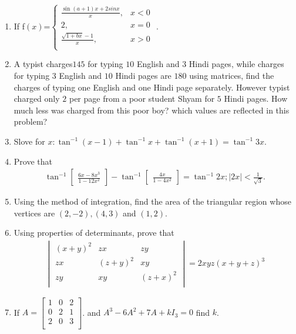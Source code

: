 \documentclass[12pt,-letter paper]{article}
\providecommand{\mydet}[1]{\ensuremath{\begin{vmatrix}#1\end{vmatrix}}}
\providecommand{\myvec}[1]{\ensuremath{\begin{bmatrix}#1\end{bmatrix}}}
\providecommand{\brak}[1]{\ensuremath{\left(#1\right)}}
\begin{document}
\begin{enumerate}
		  \item If f\brak{x}=$\begin{cases}
		  \frac{\sin(a+1)x+2 sinx}{x},&x<0\\   2  ,&x=0\\ \frac{\sqrt{1+bx}-1}{x},&x>0\\ \end{cases}$
   .




 \item A typist charges\rupee$145$ for typing $10$ English and $3$ Hindi pages, while charges for typing $3$ English and $10$ Hindi pages are \rupee$180$ using matrices, find the charges of typing one English and one Hindi page separately. However typist charged only \rupee$2$  per page from a poor student Shyam for $5$ Hindi pages. How much less was charged from this poor boy? which values are reflected in this problem?

 \item Slove for $x:\tan^{-1}\brak{x-1}+\tan^{-1}x+\tan^{-1}\brak{x+1}=\tan^{-1}3x$.



 \item Prove that \begin{align*}\tan^{-1}\myvec{\frac{6x-8x^3}{1-12x^2}}-\tan^{-1}\myvec{\frac{4x}{1-4x^2}}=\tan^{-1}2x;|2x|<\frac{1}{\sqrt{3}}. \end{align*}



 \item Using the method of integration, find the area of the triangular region whose vertices are $\brak{2,-2}, \brak{4,3}$ and $\brak{1,2}$.
   
 \item Using properties of determinants, prove that \begin{align*}\mydet{ \brak{x+y}^{2} & zx &  zy\\ zx & \brak{z+y}^{2} & xy\\ zy & xy & \brak{z+x}^{2}\\}=2xyz\brak{x+y+z}^{3} \end{align*}





\item  If $A=\myvec{1 & 0 & 2 \\
	           0  & 2 & 1 \\
	            2 & 0 & 3 \\}$. and $A^3-6A^2+7A+kI_3=0$  find $k$.




\end{enumerate}
\end{document}
